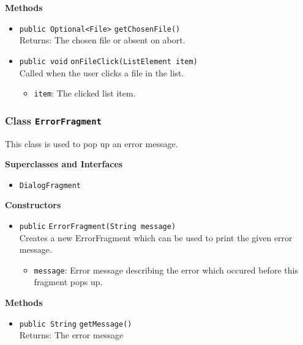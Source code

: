 \textbf{Methods}
\begin{itemize}
\item \lstinline|public Optional<File>| \lstinline|getChosenFile|\lstinline|()|\\
Returns: The chosen file or absent on abort.



\item \lstinline|public void| \lstinline|onFileClick|\lstinline|(ListElement item)|\\
Called when the user clicks a file in the list.
\begin{itemize}
\item \lstinline|item|: The clicked list item.
\end{itemize}



\end{itemize}

\subsubsection{Class \lstinline|ErrorFragment|}
This class is used to pop up an error message. \\



\textbf{Superclasses and Interfaces}
\begin{itemize}
\item \lstinline|DialogFragment|
\end{itemize}



\textbf{Constructors}
\begin{itemize}
\item \lstinline|public| \lstinline|ErrorFragment|\lstinline|(String message)|\\
Creates a new ErrorFragment which can be used to print the given error message.
\begin{itemize}
\item \lstinline|message|: Error message describing the error which occured before this fragment pops up.
\end{itemize}



\end{itemize}


\textbf{Methods}
\begin{itemize}
\item \lstinline|public String| \lstinline|getMessage|\lstinline|()|\\
Returns: The error message



\end{itemize}


